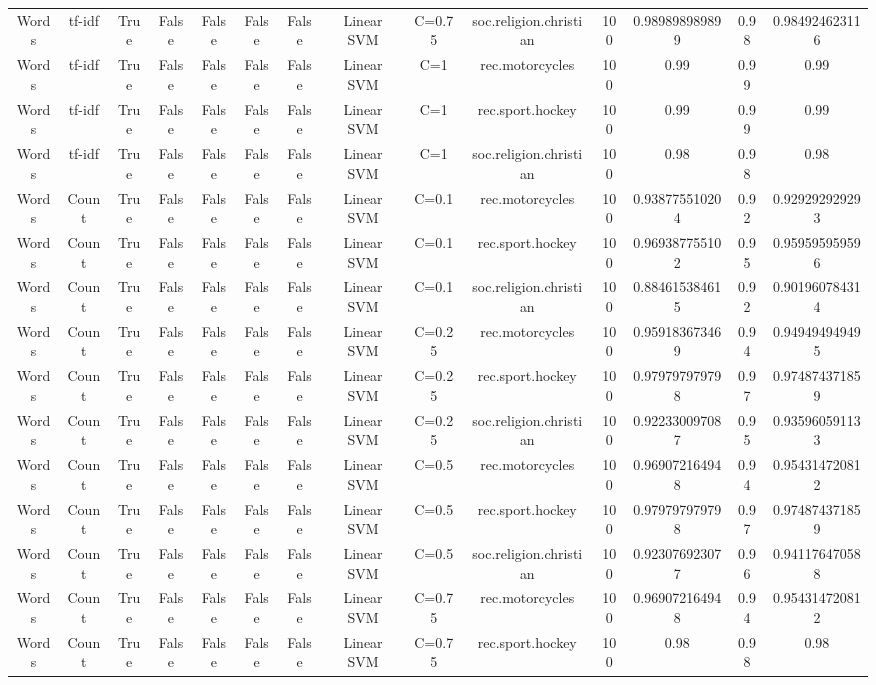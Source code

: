\documentclass[11pt]{article}
\begin{document}
\begin{tabular}{|c|c|c|c|c|c|c|c|c|c|c|c|c|c|}
Words & tf-idf & True & False & False & False & False & Linear SVM & C=0.75 & soc.religion.christian & 100 & 0.989898989899 & 0.98 & 0.984924623116 \\ 
Words & tf-idf & True & False & False & False & False & Linear SVM & C=1 & rec.motorcycles & 100 & 0.99 & 0.99 & 0.99 \\ 
Words & tf-idf & True & False & False & False & False & Linear SVM & C=1 & rec.sport.hockey & 100 & 0.99 & 0.99 & 0.99 \\ 
Words & tf-idf & True & False & False & False & False & Linear SVM & C=1 & soc.religion.christian & 100 & 0.98 & 0.98 & 0.98 \\ 
Words & Count & True & False & False & False & False & Linear SVM & C=0.1 & rec.motorcycles & 100 & 0.938775510204 & 0.92 & 0.929292929293 \\ 
Words & Count & True & False & False & False & False & Linear SVM & C=0.1 & rec.sport.hockey & 100 & 0.969387755102 & 0.95 & 0.959595959596 \\ 
Words & Count & True & False & False & False & False & Linear SVM & C=0.1 & soc.religion.christian & 100 & 0.884615384615 & 0.92 & 0.901960784314 \\ 
Words & Count & True & False & False & False & False & Linear SVM & C=0.25 & rec.motorcycles & 100 & 0.959183673469 & 0.94 & 0.949494949495 \\ 
Words & Count & True & False & False & False & False & Linear SVM & C=0.25 & rec.sport.hockey & 100 & 0.979797979798 & 0.97 & 0.974874371859 \\ 
Words & Count & True & False & False & False & False & Linear SVM & C=0.25 & soc.religion.christian & 100 & 0.922330097087 & 0.95 & 0.935960591133 \\ 
Words & Count & True & False & False & False & False & Linear SVM & C=0.5 & rec.motorcycles & 100 & 0.969072164948 & 0.94 & 0.954314720812 \\ 
Words & Count & True & False & False & False & False & Linear SVM & C=0.5 & rec.sport.hockey & 100 & 0.979797979798 & 0.97 & 0.974874371859 \\ 
Words & Count & True & False & False & False & False & Linear SVM & C=0.5 & soc.religion.christian & 100 & 0.923076923077 & 0.96 & 0.941176470588 \\ 
Words & Count & True & False & False & False & False & Linear SVM & C=0.75 & rec.motorcycles & 100 & 0.969072164948 & 0.94 & 0.954314720812 \\ 
Words & Count & True & False & False & False & False & Linear SVM & C=0.75 & rec.sport.hockey & 100 & 0.98 & 0.98 & 0.98 \\ 

\end{tabular}
\end{document}
